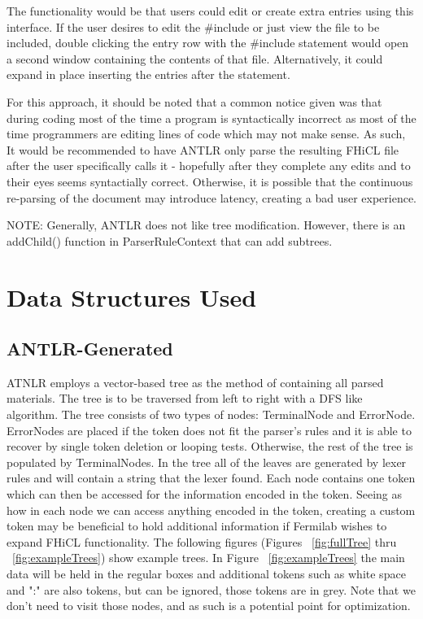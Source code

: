\documentclass{article}
\begin{document}
\begin{itemize}
    
    The functionality would be that users could edit or create extra entries using this interface. If the user desires to edit the \#include or just view the file to be included, double clicking the entry row with the \#include statement would open a second window containing the contents of that file. Alternatively, it could expand in place inserting the entries after the statement.

    For this approach, it should be noted that a common notice given was that during coding most of the time a program is syntactically incorrect as most of the time programmers are editing lines of code which may not make sense. As such, It would be recommended to have ANTLR only parse the resulting FHiCL file after the user specifically calls it - hopefully after they complete any edits and to their eyes seems syntactially correct. Otherwise, it is possible that the continuous re-parsing of the document may introduce latency, creating a bad user experience. 

    NOTE: Generally, ANTLR does not like tree modification. However, there is an addChild() function in ParserRuleContext that can add subtrees.


\end{itemize}

\section{Data Structures Used}
	\subsection{ANTLR-Generated}
		\quad ATNLR employs a vector-based tree as the method of containing all parsed materials. The tree is to be traversed from left to right with a DFS like algorithm. The tree consists of two types of nodes: TerminalNode and ErrorNode. ErrorNodes are placed if the token does not fit the parser's rules and it is able to recover by single token deletion or looping tests. Otherwise, the rest of the tree is populated by TerminalNodes. In the tree all of the leaves are generated by lexer rules and will contain a string that the lexer found. Each node contains one token which can then be accessed for the information encoded in the token. Seeing as how in each node we can access anything encoded in the token, creating a custom token may be beneficial to hold additional information if Fermilab wishes to expand FHiCL functionality. The following figures (Figures ~\ref{fig:fullTree} thru ~\ref{fig:exampleTrees}) show example trees. In Figure ~\ref{fig:exampleTrees} the main data will be held in the regular boxes and additional tokens such as white space and ":" are also tokens, but can be ignored, those tokens are in grey. Note that we don't need to visit those nodes, and as such is a potential point for optimization. 
\end{document}

